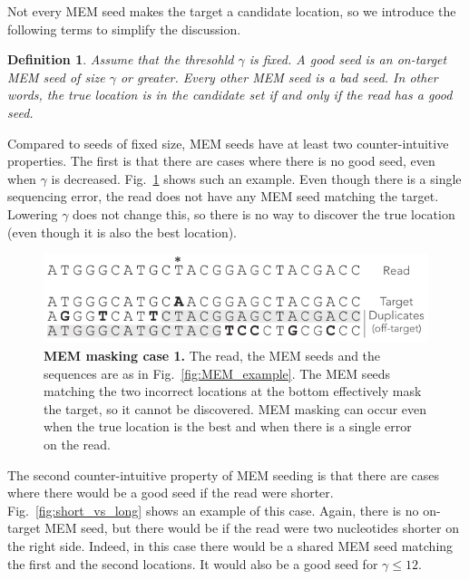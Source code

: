 \documentclass{article}
\newtheorem{definition}{Definition}
\begin{document}
Not every MEM seed makes the target a candidate location, so we introduce
the following terms to simplify the discussion.

\begin{definition}
Assume that the thresohld $\gamma$ is fixed. A \emph{good} seed is an
on-target MEM seed of size $\gamma$ or greater. Every other MEM seed is a
\emph{bad} seed. In other words, the true location is in the candidate set
if and only if the read has a good seed.
\end{definition}

Compared to seeds of fixed size, MEM seeds have at least two
counter-intuitive properties. The first is that there are cases where
there is no good seed, even when $\gamma$ is decreased.
Fig.~\ref{fig:full_masking_example} shows such an example. Even though
there is a single sequencing error, the read does not have any MEM seed
matching the target. Lowering $\gamma$ does not change this, so there is
no way to discover the true location (even though it is also the best
location).

\begin{figure}[h]
\centering
\includegraphics[scale=1]{full_masking_example.pdf}
\caption{\textbf{MEM masking case 1.}
The read, the MEM seeds and the sequences are as in
Fig.~\ref{fig:MEM_example}. The MEM seeds matching the two incorrect
locations at the bottom effectively mask the target, so it cannot
be discovered. MEM masking can occur even when the true location is the
best and when there is a single error on the read.}
\label{fig:full_masking_example}
\end{figure}

The second counter-intuitive property of MEM seeding is that there are
cases where there would be a good seed if the read were shorter.
Fig.~\ref{fig:short_vs_long} shows an example of this case. Again, there
is no on-target MEM seed, but there would be if the read were two
nucleotides shorter on the right side. Indeed, in this case there would be
a shared MEM seed matching the first and the second locations. It would
also be a good seed for $\gamma \leq 12$.
\end{document}
